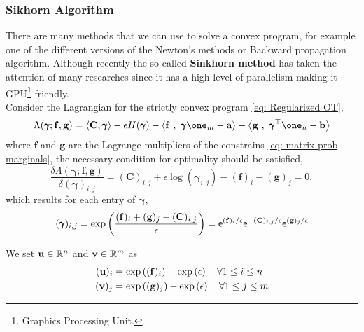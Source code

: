 \subsubsection{Sikhorn Algorithm}
There are many methods that we can use to solve a convex program, for example one of the different versions of the Newton's methods or Backward propagation algorithm. Although recently the so called \textbf{Sinkhorn method} has taken the attention of many researches since it has a high level of parallelism making it GPU\footnote{Graphics Processing Unit.} friendly.\\

Consider the Lagrangian for the strictly convex program \eqref{eq: Regularized OT},
\begin{equation}
	\Lambda(\pmb{\gamma};\mathbf{f}, \mathbf{g})=\anglesbox{\mathbf{C},\pmb{\gamma}}-\epsilon H(\pmb{\gamma})-\anglesbox{\mathbf{f}\ ,\ \pmb{\gamma}\one_m-\mathbf{a}}-\anglesbox{\mathbf{g}\ ,\ \pmb{\gamma}^\top\one_n-\mathbf{b}}
\end{equation}
where $\mathbf{f}$ and $\mathbf{g}$ are the Lagrange multipliers of the constrains \eqref{eq: matrix prob marginals}, the necessary condition for optimality should be satisfied,
\begin{equation}
	\frac{\delta\Lambda(\pmb{\gamma};\mathbf{f}, \mathbf{g})}{\delta (\pmb{\gamma})_{i,j}}=(\mathbf{C})_{i,j}+\epsilon\log(\pmb{\gamma}_{i,j})-(\mathbf{f})_i-(\mathbf{g})_{j}=0,
\end{equation}
which results for each entry of $\pmb{\gamma}$, 
\begin{equation}
	(\pmb{\gamma})_{i,j}=\exp\left( {\frac{(\mathbf{f})_i+(\mathbf{g})_{j}-(\mathbf{C})_{i,j}}{\epsilon}} \right)=\mathsf{e}^{(\mathbf{f})_i/\epsilon}\mathsf{e}^{-(\mathbf{C})_{i,j}/\epsilon}\mathsf{e}^{(\mathbf{g})_j/\epsilon}
\end{equation}

We set $\mathbf{u}\in \mathbb{R}^n$ and $\mathbf{v}\in\mathbb{R}^m$ as 
\begin{align}
(\mathbf{u})_{i}&=\exp\left( (\mathbf{f})_i \right)-\exp\left( \epsilon \right)\quad \forall 1\leq i \leq n\\
(\mathbf{v})_{j}&=\exp\left( (\mathbf{g})_j \right)-\exp\left( \epsilon \right)\quad \forall 1\leq j \leq m
\end{align} 

